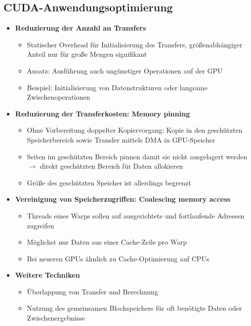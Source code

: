 \subsection{CUDA-Anwendungsoptimierung}
\begin{itemize}
	\item \textbf{Reduzierung der Anzahl an Transfers}
	\begin{itemize}
		\item Statischer Overhead für Initialisierung des Transfers, größenabhängiger Anteil nur für große Mengen signifikant
		\item Ansatz: Ausführung auch ungünstiger Operationen auf der GPU
		\item Beispiel: Initialisierung von Datenstrukturen oder langsame Zwischenoperationen
	\end{itemize}
	\item \textbf{Reduzierung der Transferkosten: Memory pinning}
	\begin{itemize}
		\item Ohne Vorbereitung doppelter Kopiervorgang: Kopie in den geschützten Speicherbereich sowie Transfer mittels DMA in GPU-Speicher
		\item Seiten im geschützten Bereich pinnen damit sie nicht ausgelagert werden \(\rightarrow\) direkt geschützten Bereich für Daten allokieren
		\item Größe des geschützten Speicher ist allerdings begrenzt
	\end{itemize}
	\item \textbf{Vereinigung von Speicherzugriffen: Coalescing memory access}
	\begin{itemize}
		\item Threads eines Warps sollen auf ausgerichtete und fortlaufende Adressen zugreifen
		\item Möglichst nur Daten aus einer Cache-Zeile pro Warp
		\item Bei neueren GPUs ähnlich zu Cache-Optimierung auf CPUs
	\end{itemize}
	\item \textbf{Weitere Techniken}
	\begin{itemize}
		\item Überlappung von Transfer und Berechnung
		\item Nutzung des gemeinsamen Blockspeichers für oft benötigte Daten oder Zwischenergebnisse
	\end{itemize}
\end{itemize}



